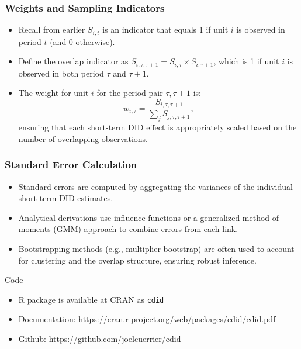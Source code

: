 \documentclass{beamer}
\begin{document}
\begin{frame}
\frametitle{Weights and Sampling Indicators}
\begin{itemize}
  \item Recall from earlier \(S_{i,t}\) is an indicator that equals 1 if unit \(i\) is observed in period \(t\) (and 0 otherwise).
  \item Define the overlap indicator as \(S_{i,\tau,\tau+1} = S_{i,\tau} \times S_{i,\tau+1}\), which is 1 if unit \(i\) is observed in both period \(\tau\) and \(\tau+1\).
  \item The weight for unit \(i\) for the period pair \(\tau,\tau+1\) is:
    \[
      w_{i,\tau} = \frac{S_{i,\tau,\tau+1}}{\sum_{j} S_{j,\tau,\tau+1}},
    \]
    ensuring that each short-term DID effect is appropriately scaled based on the number of overlapping observations.
\end{itemize}
\end{frame}

\begin{frame}
\frametitle{Standard Error Calculation}
\begin{itemize}
  \item Standard errors are computed by aggregating the variances of the individual short-term DID estimates.
  \item Analytical derivations use influence functions or a generalized method of moments (GMM) approach to combine errors from each link.
  \item Bootstrapping methods (e.g., multiplier bootstrap) are often used to account for clustering and the overlap structure, ensuring robust inference.
\end{itemize}
\end{frame}

\begin{frame}{Code}

\begin{itemize}
\item R package is available at CRAN as \texttt{cdid}
\item Documentation: \url{https://cran.r-project.org/web/packages/cdid/cdid.pdf}
\item Github: \url{https://github.com/joelcuerrier/cdid}
\end{itemize}

\end{frame}
\end{document}
